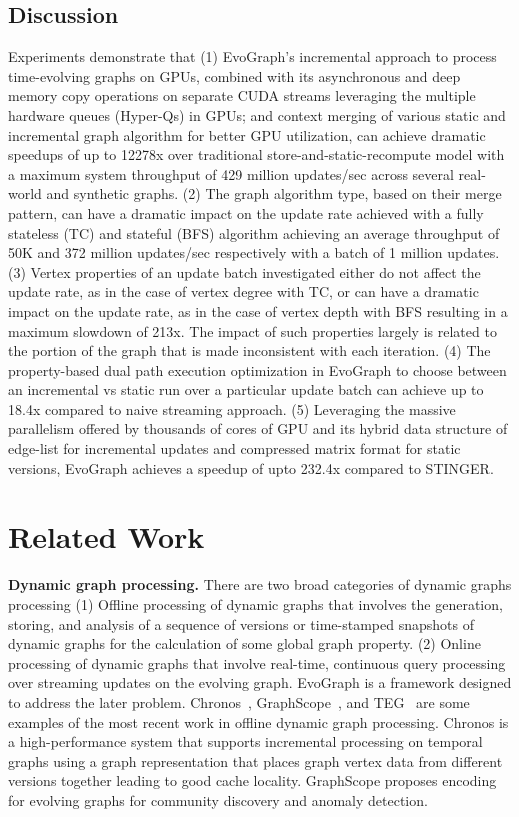 \subsection{Discussion} 
Experiments demonstrate that (1) EvoGraph’s incremental approach to process time-evolving graphs on GPUs, combined with its asynchronous and deep memory copy operations on separate CUDA streams leveraging the multiple hardware queues (Hyper-Qs) in GPUs; and context merging of various static and incremental graph algorithm for better GPU utilization, can achieve dramatic speedups of up to 12278x over traditional store-and-static-recompute model with a maximum system throughput of 429 million updates/sec across several real-world and synthetic graphs. (2) The  graph algorithm type, based on their merge pattern,  can have a dramatic impact on the update rate achieved with a fully stateless (TC) and stateful (BFS) algorithm achieving an average throughput of 50K and 372 million updates/sec respectively with a batch of  1 million updates. (3) Vertex properties of an update batch investigated either do not affect the update rate, as in the case of vertex degree with TC, or can have a dramatic impact on the update rate, as in the case of vertex depth with BFS resulting in a maximum slowdown of 213x. The impact of such properties largely is related to the portion of the graph that is made inconsistent with each iteration. (4) The property-based dual path execution optimization in EvoGraph to choose between an incremental vs static run over a particular update batch can achieve up to 18.4x compared to naive streaming approach. (5) Leveraging the massive parallelism offered by thousands of cores of GPU and its hybrid data structure of edge-list for incremental updates and compressed matrix format for  static versions, EvoGraph achieves a speedup of upto 232.4x compared to STINGER.

\iffalse
\section{Related Work}

\textbf{Dynamic graph processing.} There are two broad categories of dynamic graphs processing (1) Offline processing of dynamic graphs that involves the generation, storing, and analysis of a sequence of versions or time-stamped snapshots of dynamic graphs for the calculation of some global graph property. (2) Online processing of dynamic graphs that  involve real-time, continuous query processing over streaming updates on the evolving graph. EvoGraph is a framework designed to address the later problem.
Chronos~\cite{chronos}, GraphScope~\cite{graphscope}, and TEG~\cite{teg} are some examples of the most recent work in offline dynamic graph processing. Chronos is a high-performance system that supports incremental processing on temporal graphs using a graph representation that places graph vertex data from different versions together leading to good cache locality. GraphScope proposes encoding for evolving graphs for community discovery and anomaly detection. 

